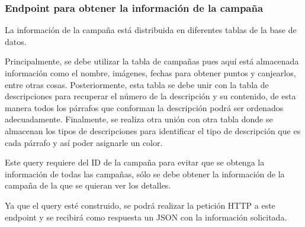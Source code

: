 \subsubsection{Endpoint para obtener la información de la campaña}
La información de la campaña está distribuida en diferentes tablas de la base de datos. 

Principalmente, se debe utilizar la tabla de campañas pues aquí está almacenada información como el nombre, imágenes, fechas para obtener puntos y canjearlos, entre otras cosas. Posteriormente, esta tabla se debe unir con la tabla de descripciones para recuperar el número de la descripción y su contenido, de esta manera todos los párrafos que conforman la descripción podrá ser ordenados adecuadamente. Finalmente, se realiza otra unión con otra tabla donde se almacenan los tipos de descripciones para identificar el tipo de descripción que es cada párrafo y así poder asignarle un color.

Este query requiere del ID de la campaña para evitar que se obtenga la información de todas las campañas, sólo se debe obtener la información de la campaña de la que se quieran ver los detalles.

Ya que el query esté construido, se podrá realizar la petición HTTP a este endpoint y se recibirá como respuesta un JSON con la información solicitada.